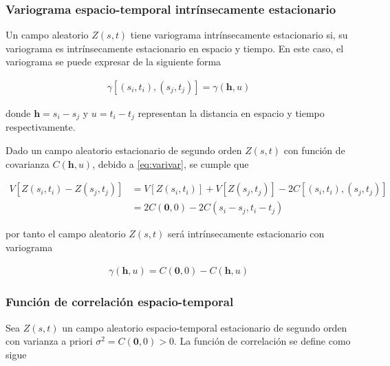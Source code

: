 \documentclass[
]{book}
\begin{document}
\hypertarget{variograma-espacio-temporal-intruxednsecamente-estacionario}{%
\subsubsection*{Variograma espacio-temporal intrínsecamente estacionario}\label{variograma-espacio-temporal-intruxednsecamente-estacionario}}

Un campo aleatorio \(Z(s,t)\) tiene variograma intrínsecamente estacionario si, su variograma es intrínsecamente estacionario en espacio y tiempo. En este caso, el variograma se puede expresar de la siguiente forma

\begin{align}
\gamma[(s_i,t_i),(s_j,t_j)]=\gamma(\textbf{h},u)
\end{align}

donde \(\textbf{h}=s_i-s_j\) y \(u=t_i-t_j\) representan la distancia en espacio y tiempo respectivamente.

Dado un campo aleatorio estacionario de segundo orden \(Z(s,t)\) con función de covarianza \(C(\textbf{h},u)\), debido a \eqref{eq:varivar}, se cumple que

\begin{align}
V[Z(s_i,t_i)-Z(s_j,t_j)]&=V[Z(s_i,t_i)]+V[Z(s_j,t_j)]-2C[(s_i,t_i),(s_j,t_j)]\\
&=2C(\textbf{0},0)-2C(s_i-s_j,t_i-t_j)
\end{align}

por tanto el campo aleatorio \(Z(s,t)\) será intrínsecamente estacionario con variograma

\begin{align}
\gamma(\textbf{h},u)=C(\textbf{0},0)-C(\textbf{h},u)
\end{align}

\hypertarget{funciuxf3n-de-correlaciuxf3n-espacio-temporal}{%
\subsubsection*{Función de correlación espacio-temporal}\label{funciuxf3n-de-correlaciuxf3n-espacio-temporal}}

Sea \(Z(s,t)\) un campo aleatorio espacio-temporal estacionario de segundo orden con varianza a priori \(\sigma^2 = C(\textbf{0},0)>0\). La función de correlación se define como sigue
\end{document}

